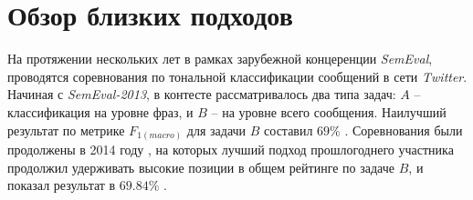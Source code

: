 \section{Обзор близких подходов}
    \label{sec:review}








    На протяжении нескольких лет в рамках зарубежной концеренции {\it SemEval},
    проводятся соревнования по тональной классификации сообщений в сети {\it Twitter}.
    Начиная с {\it SemEval-2013}, в контесте рассматривалось два типа задач: $A$
    -- классификация на уровне фраз, и $B$ -- на уровне всего сообщения.
    Наилучший результат по метрике $F_{1(macro)}$ для задачи $B$ составил
    $69\%$ \cite{semEval2013}.
    Соревнования были продолжены в 2014 году \cite{semEval2014}, на которых
    лучший подход прошлогоднего участника продолжил удерживать высокие позиции в
    общем рейтинге по задаче $B$, и показал результат в $69.84\%$
    \cite{modernApproach}.


